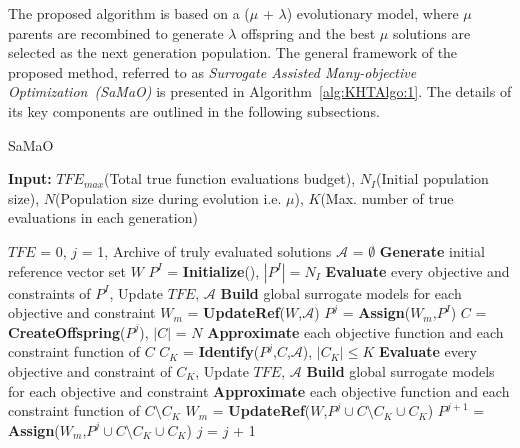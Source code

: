 \documentclass[twocolumn,10pt]{asme2ej}
\begin{document}
The proposed algorithm is based on a ($\mu$ + $\lambda$) evolutionary model, where $\mu$ parents are recombined to generate $\lambda$ offspring and the best $\mu$ solutions are selected as the next generation population. The general framework of the proposed method, referred to as \textit{Surrogate Assisted Many-objective Optimization~(SaMaO)} is presented in Algorithm~\ref{alg:KHTAlgo:1}. The details of its key components are outlined in the following subsections. 


\begin{algorithm}[!ht]\footnotesize
	\caption{SaMaO}
	\textbf{Input:} $TFE_{max}$\hspace{1mm}(Total true function evaluations budget), $N_I$\hspace{1mm}(Initial population size), $N$\hspace{1mm}(Population size during evolution i.e. $\mu$), $K$\hspace{1mm}(Max. number of true evaluations in each generation)
	\begin{algorithmic}[1]
		\STATE $TFE$ = 0, $j$ = 1, Archive of truly evaluated solutions $\mathcal{A}$ = $\emptyset$
		\STATE \textbf{Generate} initial reference vector set $W$ 
		\STATE $P^I$ = \textbf{Initialize}(), $\left|P^I\right| = N_I$ 
		\STATE \textbf{Evaluate} every objective and constraints of $P^I$, Update $TFE$, $\mathcal{A}$ 
		\STATE \textbf{Build} global surrogate models for each objective and constraint
		\STATE $W_m$ = \textbf{UpdateRef}($W$,$\mathcal{A}$)
		\STATE $P^j$ = \textbf{Assign}($W_m$,$P^I$) 	
		\STATE $C$ = \textbf{CreateOffspring}($P^j$), $\left|C\right|$ = $N$
		\STATE \textbf{Approximate} each objective function and each constraint function of $C$
		\STATE $C_K$ = \textbf{Identify}($P^j$,$C$,$\mathcal{A}$), $\left|C_K\right| \le K$
		\STATE \textbf{Evaluate} every objective and constraint of $C_K$, Update $TFE$, $\mathcal{A}$
		\STATE \textbf{Build} global surrogate models for each objective and constraint
		\STATE \textbf{Approximate} each objective function and each constraint function of $C \setminus C_K$
		\STATE $W_m$ = \textbf{UpdateRef}($W$,$P^j \cup C \setminus C_K \cup C_K$)
		\STATE $P^{j+1}$ = \textbf{Assign}($W_m$,$P^j \cup C \setminus C_K \cup C_K$)   
		\STATE $j$ = $j$ + 1
		\ENDWHILE			
		
	\end{algorithmic}
	\label{alg:KHTAlgo:1}
\end{algorithm}
\end{document}
